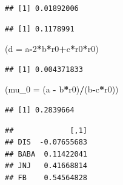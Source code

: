 \documentclass[]{article}
\newenvironment{Shaded}{\begin{snugshade}}{\end{snugshade}}
\newcommand{\KeywordTok}[1]{\textcolor[rgb]{0.13,0.29,0.53}{\textbf{#1}}}
\newcommand{\DataTypeTok}[1]{\textcolor[rgb]{0.13,0.29,0.53}{#1}}
\newcommand{\DecValTok}[1]{\textcolor[rgb]{0.00,0.00,0.81}{#1}}
\newcommand{\StringTok}[1]{\textcolor[rgb]{0.31,0.60,0.02}{#1}}
\newcommand{\OperatorTok}[1]{\textcolor[rgb]{0.81,0.36,0.00}{\textbf{#1}}}
\newcommand{\NormalTok}[1]{#1}
\begin{document}
\begin{verbatim}
## [1] 0.01892006
\end{verbatim}

\begin{Shaded}
\end{Shaded}

\begin{verbatim}
## [1] 0.1178991
\end{verbatim}

\begin{Shaded}
\begin{Highlighting}[]
\NormalTok{(}\DataTypeTok{d =}\NormalTok{ a}\OperatorTok{-}\DecValTok{2}\OperatorTok{*}\NormalTok{b}\OperatorTok{*}\NormalTok{r0}\OperatorTok{+}\NormalTok{c}\OperatorTok{*}\NormalTok{r0}\OperatorTok{*}\NormalTok{r0)}
\end{Highlighting}
\end{Shaded}

\begin{verbatim}
## [1] 0.004371833
\end{verbatim}

\begin{Shaded}
\begin{Highlighting}[]
\NormalTok{(}\DataTypeTok{mu_0 =}\NormalTok{ (a }\OperatorTok{-}\StringTok{ }\NormalTok{b}\OperatorTok{*}\NormalTok{r0)}\OperatorTok{/}\NormalTok{(b}\OperatorTok{-}\NormalTok{c}\OperatorTok{*}\NormalTok{r0))}
\end{Highlighting}
\end{Shaded}

\begin{verbatim}
## [1] 0.2839664
\end{verbatim}

\begin{Shaded}
\end{Shaded}

\begin{verbatim}
##             [,1]
## DIS  -0.07655683
## BABA  0.11422041
## JNJ   0.41668814
## FB    0.54564828
\end{verbatim}
\end{document}
